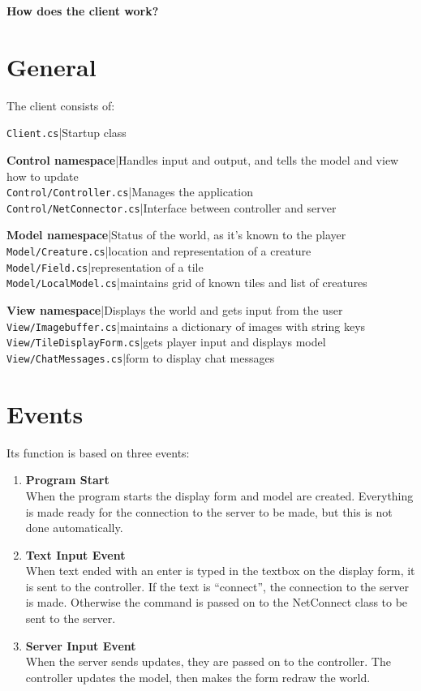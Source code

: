 \documentclass{article}
\begin{document}
	\textbf{\Large{How does the client work?}}
	
	\section{General}
		The client consists of:
				
		\texttt{Client.cs}|Startup class
		
		\vspace{3 mm}
		
		\textbf{Control namespace}|Handles input and output, and tells the model and view how to update\\
		\texttt{Control/Controller.cs}|Manages the application\\
		\texttt{Control/NetConnector.cs}|Interface between controller and server
		
		\vspace{3 mm}
		
		\textbf{Model namespace}|Status of the world, as it's known to the player\\
		\texttt{Model/Creature.cs}|location and representation of a creature\\
		\texttt{Model/Field.cs}|representation of a tile\\
		\texttt{Model/LocalModel.cs}|maintains grid of known tiles and list of creatures
		
		\vspace{3 mm}
		
		\textbf{View namespace}|Displays the world and gets input from the user\\
		\texttt{View/Imagebuffer.cs}|maintains a dictionary of images with string keys\\
		\texttt{View/TileDisplayForm.cs}|gets player input and displays model\\
		\texttt{View/ChatMessages.cs}|form to display chat messages
		
	\section{Events}
		Its function is based on three events:
		
		\begin{enumerate}
			\item
				\textbf{Program Start}\\
				When the program starts the display form and model are created. Everything is made ready for the connection to the server to be made, but this is not done automatically.
			\item
				\textbf{Text Input Event}\\
				When text ended with an enter is typed in the textbox on the display form, it is sent to the controller. If the text is ``connect'', the connection to the server is made. Otherwise the command is passed on to
				the NetConnect class to be sent to the server.
			\item
				\textbf{Server Input Event}\\
				When the server sends updates, they are passed on to the controller. The controller updates the model, then makes the form redraw the world.
		\end{enumerate}
\end{document}
